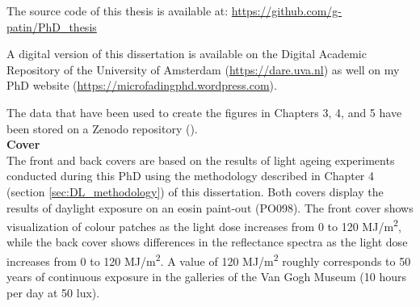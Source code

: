 The source code of this thesis is available at: \url{https://github.com/g-patin/PhD_thesis}

A digital version of this dissertation is available on the Digital Academic Repository of the University of Amsterdam (\url{https://dare.uva.nl}) as well on my PhD website (\url{https://microfadingphd.wordpress.com}). 

The data that have been used to create the figures in Chapters 3, 4, and 5 have been stored on a Zenodo repository (). \\

\textbf{Cover} \\
The front and back covers are based on the results of light ageing experiments conducted during this PhD using the methodology described in Chapter 4 (section \ref{sec:DL_methodology}) of this dissertation. Both covers display the results of daylight exposure on an eosin paint-out (PO098). The front cover shows visualization of colour patches as the light dose increases from 0 to 120 MJ/m\textsuperscript{2}, while the back cover shows differences in the reflectance spectra as the light dose increases from 0 to 120 MJ/m\textsuperscript{2}. A value of 120 MJ/m\textsuperscript{2} roughly corresponds to 50 years of continuous exposure in the galleries of the Van Gogh Museum (10 hours per day at 50 lux).




